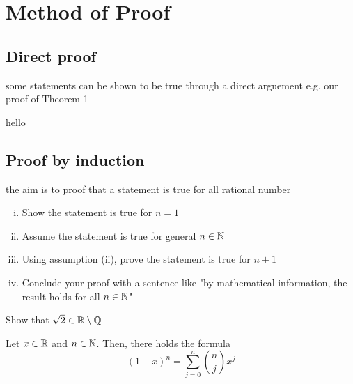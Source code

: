 \chapter{Method of Proof}
\section{Direct proof}
some statements can be shown to be true through a direct arguement e.g. our proof of Theorem 1
\begin{theorem}
    hello
\end{theorem}
\section{Proof by induction}
the aim is to proof that a statement is true for all rational number
\begin{enumerate}[(i)]
    \item Show the statement is true for $n=1$
    \item Assume the statement is true for general $n\in \mathbb N$
    \item Using assumption (ii), prove the statement is true for $n+1$
    \item Conclude your proof with a sentence like "by mathematical information, the result holds for all $n\in \mathbb N$"
\end{enumerate}

\begin{example}
    Show that $\sqrt{2} \in \mathbb R\setminus\mathbb Q$
\end{example}

\begin{theorem}
    Let $x\in \mathbb R$ and $n \in \mathbb N$. Then, there holds the formula
    $$(1+x)^n=\sum_{j=0}^{n} \binom{n}{j}x^j$$
\end{theorem}
